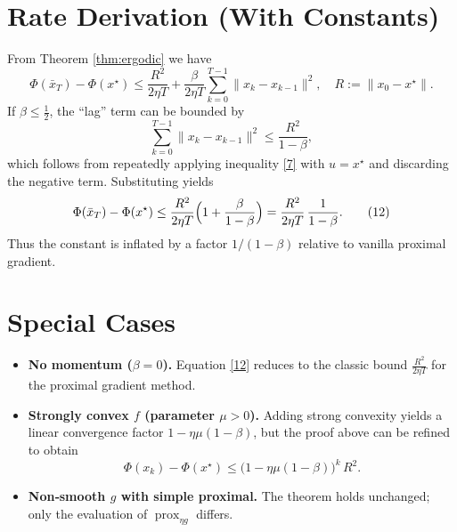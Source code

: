 \documentclass{article}
\newcommand{\prox}{\operatorname{prox}}
\begin{document}
\section*{Rate Derivation (With Constants)}
From Theorem \ref{thm:ergodic} we have
\[
\Phi(\bar x_T)-\Phi(x^\star)
\le
\frac{R^{2}}{2\eta T}
+\frac{\beta}{2\eta T}\sum_{k=0}^{T-1}\|x_k-x_{k-1}\|^{2},
\quad R:=\|x_0-x^\star\|.
\tag{11}
\]
If $\beta\le\frac12$, the “lag” term can be bounded by
\[
\sum_{k=0}^{T-1}\|x_k-x_{k-1}\|^{2}
\le
\frac{R^{2}}{1-\beta},
\]
which follows from repeatedly applying inequality \eqref{7} with $u=x^\star$ and discarding the negative term. Substituting yields
\[
\Phi(\bar x_T)-\Phi(x^\star)
\le
\frac{R^{2}}{2\eta T}
\Bigl(1+\frac{\beta}{1-\beta}\Bigr)
=
\frac{R^{2}}{2\eta T}\,\frac{1}{1-\beta}.
\tag{12}
\]
Thus the constant is inflated by a factor $1/(1-\beta)$ relative to vanilla proximal gradient.

\section*{Special Cases}
\begin{itemize}
\item \textbf{No momentum ($\beta=0$).}  Equation \eqref{12} reduces to the classic bound $\frac{R^{2}}{2\eta T}$ for the proximal gradient method.
\item \textbf{Strongly convex $f$ (parameter $\mu>0$).}  Adding strong convexity yields a linear convergence factor $1-\eta\mu(1-\beta)$, but the proof above can be refined to obtain
\[
\Phi(x_k)-\Phi(x^\star)\le \bigl(1-\eta\mu(1-\beta)\bigr)^{k}\,R^{2}.
\]
\item \textbf{Non‑smooth $g$ with simple proximal.}  The theorem holds unchanged; only the evaluation of $\prox_{\eta g}$ differs.
\end{itemize}
\end{document}
